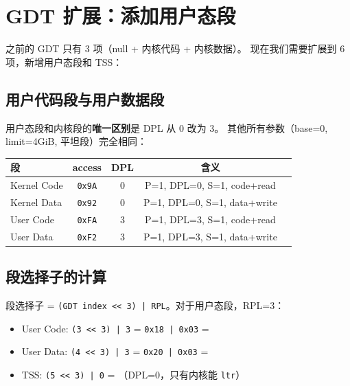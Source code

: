 \section{GDT 扩展：添加用户态段}
\label{sec:tss-gdt-extend}

之前的 GDT 只有 3 项（null + 内核代码 + 内核数据）。
现在我们需要扩展到 6 项，新增用户态段和 TSS：



\subsection{用户代码段与用户数据段}

用户态段和内核段的\textbf{唯一区别}是 DPL 从 0 改为 3。
其他所有参数（base=0, limit=4GiB, 平坦段）完全相同：

\begin{center}
\begin{tabular}{lcccc}
\toprule
\textbf{段} & \textbf{access} & \textbf{DPL} & \textbf{含义} \\
\midrule
Kernel Code & \texttt{0x9A} & 0 & P=1, DPL=0, S=1, code+read \\
Kernel Data & \texttt{0x92} & 0 & P=1, DPL=0, S=1, data+write \\
User Code   & \texttt{0xFA} & 3 & P=1, DPL=3, S=1, code+read \\
User Data   & \texttt{0xF2} & 3 & P=1, DPL=3, S=1, data+write \\
\bottomrule
\end{tabular}
\end{center}

\subsection{段选择子的计算}

段选择子 = \texttt{(GDT index << 3) | RPL}。对于用户态段，RPL=3：

\begin{itemize}
  \item User Code: \texttt{(3 << 3) | 3} = \texttt{0x18 | 0x03} = 
  \item User Data: \texttt{(4 << 3) | 3} = \texttt{0x20 | 0x03} = 
  \item TSS:       \texttt{(5 << 3) | 0} = （DPL=0，只有内核能 \texttt{ltr}）
\end{itemize}

